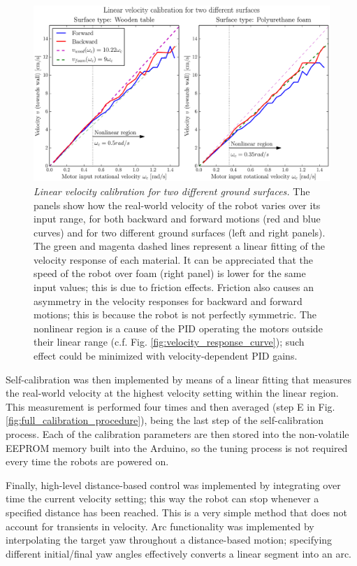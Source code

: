 \documentclass[12pt,twoside]{report}
\begin{document}
\begin{figure}[hbtp]
\centerline{
\includegraphics[width=1.05\linewidth]{linear_velocity_calibration_curves}}
\caption[Linear velocity calibration for two different ground surfaces]{\emph{Linear velocity calibration for two different ground surfaces.}
The panels show how the real-world velocity of the robot varies over its input range, for both backward and forward motions (red and blue curves) and for two different ground surfaces (left and right panels).
The green and magenta dashed lines represent a linear fitting of the velocity response of each material.
It can be appreciated that the speed of the robot over foam (right panel) is lower for the same input values; this is due to friction effects.
Friction also causes an asymmetry in the velocity responses for backward and forward motions; this is because the robot is not perfectly symmetric.
The nonlinear region is a cause of the PID operating the motors outside their linear range (c.f. Fig. \ref{fig:velocity_response_curve});
such effect could be minimized with velocity-dependent PID gains.
}
\label{fig:linear_velocity_calibration_curves}
\end{figure}


Self-calibration was then implemented by means of a linear fitting that measures the real-world velocity at the highest velocity setting within the linear region. This measurement is performed four times and then averaged (step E in Fig. \ref{fig:full_calibration_procedure}), being the last step of the self-calibration process.
Each of the calibration parameters are then stored into the non-volatile EEPROM memory built into the Arduino, so the tuning process is not required every time the robots are powered on.

Finally, high-level distance-based control was implemented by integrating over time the current velocity setting; this way the robot can stop whenever a specified distance has been reached. This is a very simple method that does not account for transients in velocity.
Arc functionality was implemented by interpolating the target yaw throughout a distance-based motion; specifying different initial/final yaw angles effectively converts a linear segment into an arc.
\end{document}
